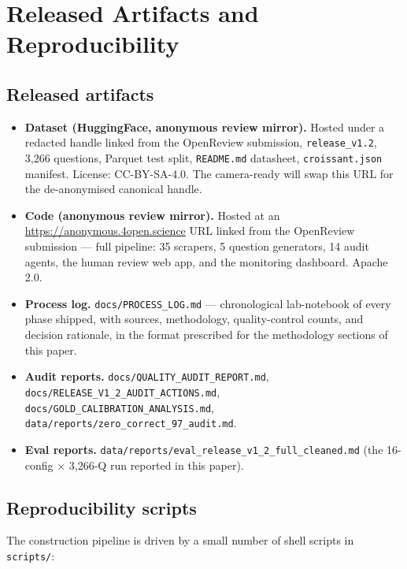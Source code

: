 \section{Released Artifacts and Reproducibility}
\label{app:artifacts}

\subsection{Released artifacts}

\begin{itemize}\itemsep -1pt
  \item \textbf{Dataset (HuggingFace, anonymous review mirror).}
    Hosted under a redacted handle linked from the OpenReview
    submission, \texttt{release\_v1.2}, 3{,}266 questions, Parquet
    test split, \texttt{README.md} datasheet, \texttt{croissant.json}
    manifest. License: CC-BY-SA-4.0. The camera-ready will swap this
    URL for the de-anonymised canonical handle.
  \item \textbf{Code (anonymous review mirror).}
    Hosted at an \url{https://anonymous.4open.science} URL linked
    from the OpenReview submission --- full pipeline: 35 scrapers, 5
    question generators, 14 audit agents, the human review web app,
    and the monitoring dashboard. Apache 2.0.
  \item \textbf{Process log.} \texttt{docs/PROCESS\_LOG.md} —
    chronological lab-notebook of every phase shipped, with sources,
    methodology, quality-control counts, and decision rationale, in
    the format prescribed for the methodology sections of this paper.
  \item \textbf{Audit reports.} \texttt{docs/QUALITY\_AUDIT\_REPORT.md},
    \texttt{docs/RELEASE\_V1\_2\_AUDIT\_ACTIONS.md},
    \texttt{docs/GOLD\_CALIBRATION\_ANALYSIS.md},
    \texttt{data/reports/zero\_correct\_97\_audit.md}.
  \item \textbf{Eval reports.}
    \texttt{data/reports/eval\_release\_v1\_2\_full\_cleaned.md} (the
    16-config × 3{,}266-Q run reported in this paper).
\end{itemize}

\subsection{Reproducibility scripts}

The construction pipeline is driven by a small number of shell scripts
in \texttt{scripts/}:

